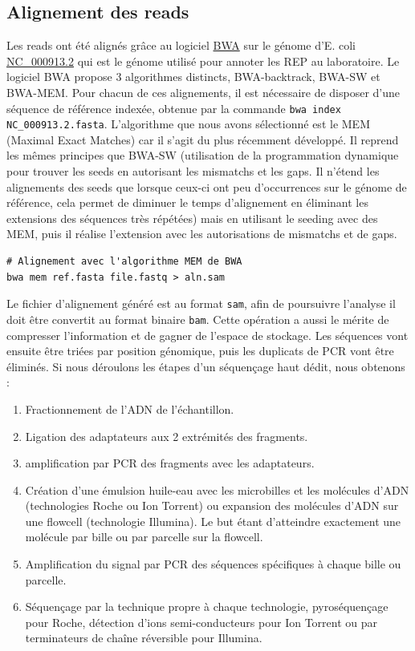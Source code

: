 \documentclass[12pt,a4paper]{report}
\begin{document}
\begin{onehalfspace}
\section*{Alignement des reads}
Les reads ont été alignés grâce au logiciel \href{http://bio-bwa.sourceforge.net/}{BWA} sur le génome d'E. coli \href{http://www.ncbi.nlm.nih.gov/nuccore/NC_000913.2}{NC\_000913.2} qui est le génome utilisé pour annoter les REP au laboratoire.  Le logiciel BWA propose 3 algorithmes distincts, BWA-backtrack, BWA-SW et BWA-MEM. Pour chacun de ces alignements, il est nécessaire de disposer d'une séquence de référence indexée, obtenue par la commande \texttt{bwa index NC\_000913.2.fasta}. 
L'algorithme que nous avons sélectionné est le MEM (Maximal Exact Matches) car il s'agit du plus récemment développé. Il reprend les mêmes principes que BWA-SW (utilisation de la programmation dynamique pour trouver les seeds en autorisant les mismatchs et les gaps. Il n'étend les alignements des seeds que lorsque ceux-ci ont peu d'occurrences sur le génome de référence, cela permet de diminuer le temps d'alignement en éliminant les extensions des séquences très répétées) mais en utilisant le seeding avec des MEM, puis il réalise l'extension avec les autorisations de mismatchs et de gaps.
\begin{lstlisting}[frame=single]
# Alignement avec l'algorithme MEM de BWA
bwa mem ref.fasta file.fastq > aln.sam
\end{lstlisting}
Le fichier d'alignement généré est au format \texttt{\gls{sam}}, afin de poursuivre l'analyse il doit être convertit au format binaire \texttt{\gls{bam}}. Cette opération a aussi le mérite de compresser l'information et de gagner de l'espace de stockage. Les séquences vont ensuite être triées par position génomique, puis les duplicats de PCR vont être éliminés.
Si nous déroulons les étapes d'un séquençage haut dédit, nous obtenons :
\begin{enumerate}
\item Fractionnement de l'ADN de l'échantillon.
\item Ligation des adaptateurs aux 2 extrémités des fragments.
\item amplification par PCR des fragments avec les adaptateurs.
\item Création d'une émulsion huile-eau avec les microbilles et les molécules d'ADN (technologies
Roche ou Ion Torrent) ou expansion des molécules d'ADN sur une flowcell (technologie
Illumina). Le but étant d'atteindre exactement une molécule par bille ou par parcelle sur la
flowcell.
\item Amplification du signal par PCR des séquences spécifiques à chaque bille ou parcelle.
\item Séquençage par la technique propre à chaque technologie, pyroséquençage pour Roche,
détection d'ions semi-conducteurs pour Ion Torrent ou par terminateurs de chaîne réversible
pour Illumina.
\end{enumerate}


\end{onehalfspace}
\end{document}
